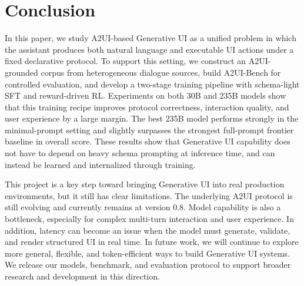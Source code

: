 \section{Conclusion}

In this paper, we study A2UI-based Generative UI as a unified problem in which the assistant produces both natural language and executable UI actions under a fixed declarative protocol. To support this setting, we construct an A2UI-grounded corpus from heterogeneous dialogue sources, build A2UI-Bench for controlled evaluation, and develop a two-stage training pipeline with schema-light SFT and reward-driven RL. Experiments on both 30B and 235B models show that this training recipe improves protocol correctness, interaction quality, and user experience by a large margin. The best 235B model performs strongly in the minimal-prompt setting and slightly surpasses the strongest full-prompt frontier baseline in overall score. These results show that Generative UI capability does not have to depend on heavy schema prompting at inference time, and can instead be learned and internalized through training.

This project is a key step toward bringing Generative UI into real production environments, but it still has clear limitations. The underlying A2UI protocol is still evolving and currently remains at version 0.8. Model capability is also a bottleneck, especially for complex multi-turn interaction and user experience. In addition, latency can become an issue when the model must generate, validate, and render structured UI in real time. In future work, we will continue to explore more general, flexible, and token-efficient ways to build Generative UI systems. We release our models, benchmark, and evaluation protocol to support broader research and development in this direction.